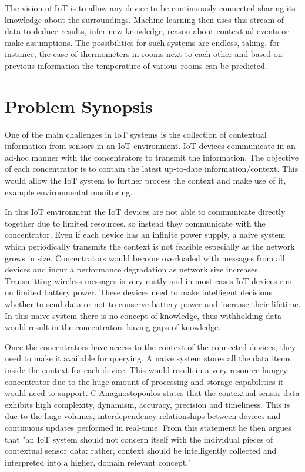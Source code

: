 \documentclass{mproj}
\begin{document}
The vision of IoT is to allow any device to be continuously connected sharing its knowledge about the surroundings. Machine learning then uses this stream of data to deduce results, infer new knowledge, reason about contextual events or make assumptions. The possibilities for such systems are endless, taking, for instance, the case of thermometers in rooms next to each other and based on previous information the temperature of various rooms can be predicted.

\section{Problem Synopsis}
One of the main challenges in IoT systems is the collection of contextual information from sensors in an IoT environment. \cite{intelligentContextualInformation} IoT devices communicate in an ad-hoc manner with the concentrators to transmit the information. The objective of each concentrator is to contain the latest up-to-date information/context. This would allow the IoT system to further process the context and make use of it, example environmental monitoring.

In this IoT environment the IoT devices are not able to communicate directly together due to limited resources, so instead they communicate with the concentrator. Even if each device has an infinite power supply, a naive system which periodically transmits the context is not feasible especially as the network grows in size. Concentrators would become overloaded with messages from all devices and incur a performance degradation as network size increases. Transmitting wireless messages is very costly and in most cases IoT devices run on limited battery power. These devices need to make intelligent decisions whether to send data or not to conserve battery power and increase their lifetime. In this naive system there is no concept of knowledge, thus withholding data would result in the concentrators having gaps of knowledge.

Once the concentrators have access to the context of the connected devices, they need to make it available for querying. A naive system stores all the data items inside the context for each device. This would result in a very resource hungry concentrator due to the huge amount of processing and storage capabilities it would need to support. C.Anagnostopoulos \cite{intelligentContextualInformation} states that the contextual sensor data exhibits high complexity, dynamism, accuracy, precision and timeliness. This is due to the huge volumes, interdependency relationships between devices and continuous updates performed in real-time. From this statement he then argues that "an IoT system should not concern itself with the individual pieces of contextual sensor data: rather, context should be intelligently collected and interpreted into a higher, domain relevant concept." \cite{intelligentContextualInformation}
\end{document}
